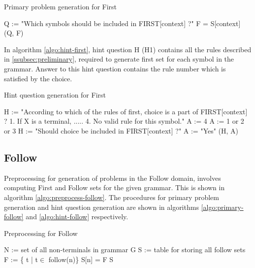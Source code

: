 \begin{algorithm}
\caption{Primary problem generation for First}
\label{algo:primary-first}
\begin{algorithmic}[1]
\State Q := "Which symbols should be included in FIRST[context] ?"
\State F = S[context]
\State \Return (Q, F)
\EndFunction
\end{algorithmic}
\end{algorithm}

In algorithm \ref{algo:hint-first}, hint question H (H1) contains all the rules described in \ref{ssubsec:preliminary}, required to generate first set for each symbol in the grammar. Answer to this hint question contains the rule number which is satisfied by the choice.
\begin{algorithm}
\caption{Hint question generation for First}
\label{algo:hint-first}
\begin{algorithmic}[1]
\State H := "According to which of the rules of first, choice is a part of FIRST[context] ? 1. If X is a terminal, ..... 4. No valid rule for this symbol."
\State A := 4
\State A := 1 or 2 or 3
\EndIf
{}
\State H := "Should choice be included in FIRST[context] ?"
\State A := "Yes"
\EndIf
\State \Return (H, A)
\EndFunction
\end{algorithmic}
\end{algorithm}

\subsection{Follow}
\label{subsec:ff-follow}

Preprocessing for generation of problems in the Follow domain, involves computing First and Follow sets for the given grammar. This is shown in algorithm \ref{algo:preprocess-follow}. The procedures for primary problem generation and hint question generation are shown in algorithms \ref{algo:primary-follow} and \ref{algo:hint-follow} respectively.

\begin{algorithm}
\caption{Preprocessing for Follow}
\label{algo:preprocess-follow}
\begin{algorithmic}[1]
\State N := set of all non-terminals in grammar G
\State S := table for storing all follow sets
\State F := \{ t | t$\in$ follow(n)\}
\State S[n] = F
\EndFor
\State \Return S
\EndFunction
\end{algorithmic}
\end{algorithm}

